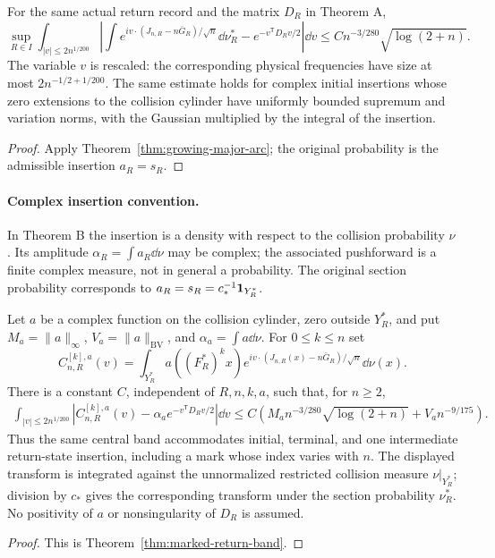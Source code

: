\begin{maintheorem}
\label{thm:intro-major-arc}
For the same actual return record and the matrix $D_R$ in Theorem A,
\[
 \sup_{R\in I}\int_{|v|\le2n^{1/200}}
 \left|\int e^{iv\cdot(J_{n,R}-n\bar G_R)/\sqrt n}\dd\nu_R^*
                       -e^{-v^{\mathsf T}D_Rv/2}\right|\dd v
       \le Cn^{-3/280}\sqrt{\log(2+n)}.
\]
The variable $v$ is rescaled: the corresponding physical frequencies
have size at most $2n^{-1/2+1/200}$. The same estimate holds for complex
initial insertions whose zero extensions to the collision cylinder
have uniformly bounded supremum and variation norms, with the Gaussian
multiplied by the integral of the insertion.
\end{maintheorem}
\begin{proof}
Apply Theorem~\ref{thm:growing-major-arc}; the original probability is
the admissible insertion $a_R=s_R$.
\end{proof}

\paragraph{Complex insertion convention.}
In Theorem B the insertion is a density with respect to the collision
probability $\nu$. Its amplitude $\alpha_R=\int a_R\dd\nu$ may be
complex; the associated pushforward is a finite complex measure, not
in general a probability. The original section probability corresponds
to $a_R=s_R=c_*^{-1}\mathbf1_{Y_R^*}$.

\begin{maintheorem}
\label{thm:intro-marked-return}
Let $a$ be a complex function on the collision cylinder, zero outside
$Y_R^*$, and put $M_a=\|a\|_\infty$, $V_a=\|a\|_{\mathrm{BV}}$,
and $\alpha_a=\int a\dd\nu$. For $0\le k\le n$ set
\[
 C^{[k],a}_{n,R}(v)=\int_{Y_R^*}a((F_R^*)^k x)
       e^{iv\cdot(J_{n,R}(x)-n\bar G_R)/\sqrt n}\dd\nu(x).
\]
There is a constant $C$, independent of $R,n,k,a$, such that, for $n\ge2$,
\begin{align*}
 \int_{|v|\le2n^{1/200}}
 \left|C^{[k],a}_{n,R}(v)-\alpha_a e^{-v^{\mathsf T}D_Rv/2}\right|\dd v
 \le C\left(M_an^{-3/280}\sqrt{\log(2+n)}+V_an^{-9/175}\right).
\end{align*}
Thus the same central band accommodates initial, terminal, and one
intermediate return-state insertion, including a mark whose index
varies with $n$. The displayed transform is integrated against the
unnormalized restricted collision measure $\nu|_{Y_R^*}$; division by
$c_*$ gives the corresponding transform under the section probability
$\nu_R^*$. No positivity of $a$ or nonsingularity of $D_R$ is assumed.
\end{maintheorem}
\begin{proof}
This is Theorem~\ref{thm:marked-return-band}.
\end{proof}


